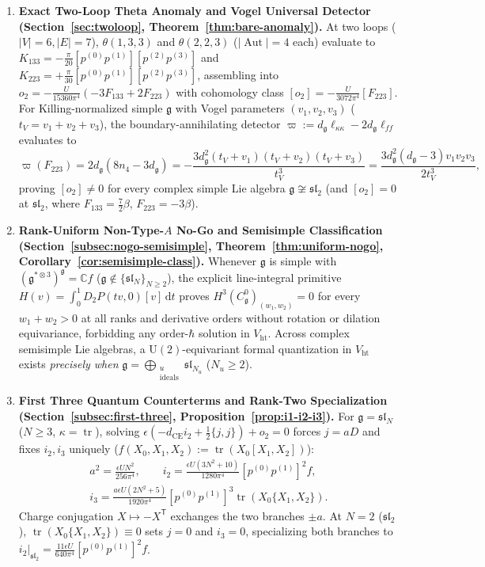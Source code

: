 \documentclass[11pt,letterpaper]{article}
\numberwithin{equation}{section}
\theoremstyle{plain}
\theoremstyle{definition}
\theoremstyle{remark}
\newcommand{\dd}{\mathrm{d}}
\newcommand{\fg}{\mathfrak{g}}
\newcommand{\fsl}{\mathfrak{sl}}
\newcommand{\tr}{\operatorname{tr}}
\newcommand{\Aut}{\operatorname{Aut}}
\newcommand{\Vht}{V_{\mathrm{ht}}}
\newcommand{\Cg}{C^0_{\fg}}
\begin{document}
\begin{enumerate}[label=\textbf{Result~\arabic*.},leftmargin=*]
  \item \textbf{Exact Two-Loop Theta Anomaly and Vogel Universal Detector (Section~\ref{sec:twoloop}, Theorem~\ref{thm:bare-anomaly}).} At two loops ($|V|=6, |E|=7$), $\theta(1,3,3)$ and $\theta(2,2,3)$ ($|\Aut|=4$ each) evaluate to $K_{133} = -\frac{\pi}{20}[p^{(0)}p^{(1)}][p^{(2)}p^{(3)}]$ and $K_{223} = +\frac{\pi}{30}[p^{(0)}p^{(1)}][p^{(2)}p^{(3)}]$, assembling into $o_2 = -\frac{U}{15360\pi^4}(-3F_{133}+2F_{223})$ with cohomology class $[o_2] = -\frac{U}{3072\pi^4}[F_{223}]$. For Killing-normalized simple $\fg$ with Vogel parameters $(v_1,v_2,v_3)$ ($t_V = v_1+v_2+v_3$), the boundary-annihilating detector $\varpi := d_{\fg}\ell_{\kappa\kappa} - 2d_{\fg}\ell_{ff}$ evaluates to
  \[
  \varpi(F_{223}) = 2d_{\fg}(8n_4 - 3d_{\fg}) = -\frac{3d_{\fg}^2(t_V+v_1)(t_V+v_2)(t_V+v_3)}{t_V^3} = \frac{3d_{\fg}^2(d_{\fg}-3)v_1 v_2 v_3}{2t_V^3},
  \]
  proving $[o_2] \neq 0$ for every complex simple Lie algebra $\fg \not\cong \fsl_2$ (and $[o_2] = 0$ at $\fsl_2$, where $F_{133} = \frac{7}{2}\beta$, $F_{223} = -3\beta$).

  \item \textbf{Rank-Uniform Non-Type-$A$ No-Go and Semisimple Classification (Section~\ref{subsec:nogo-semisimple}, Theorem~\ref{thm:uniform-nogo}, Corollary~\ref{cor:semisimple-class}).} Whenever $\fg$ is simple with $(\fg^{*\otimes 3})^{\fg} = \mathbb{C}f$ ($\fg \notin \{\fsl_N\}_{N\ge 2}$), the explicit line-integral primitive $H(v) = \int_0^1 D_2 P(tv,0)[v]\,\dd t$ proves $H^3(\Cg)_{(w_1,w_2)} = 0$ for every $w_1 + w_2 > 0$ at all ranks and derivative orders without rotation or dilation equivariance, forbidding any order-$\hbar$ solution in $\Vht$. Across complex semisimple Lie algebras, a $\mathrm{U}(2)$-equivariant formal quantization in $\Vht$ exists \emph{precisely when} $\fg = \bigoplus_{\substack{u\\\mathrm{ideals}}}\fsl_{N_u}$ ($N_u \ge 2$).

  \item \textbf{First Three Quantum Counterterms and Rank-Two Specialization (Section~\ref{subsec:first-three}, Proposition~\ref{prop:i1-i2-i3}).} For $\fg = \fsl_N$ ($N \ge 3$, $\kappa = \tr$), solving $\epsilon(-d_{\mathrm{CE}}i_2 + \frac{1}{2}\{j,j\}) + o_2 = 0$ forces $j = a D$ and fixes $i_2, i_3$ uniquely ($f(X_0,X_1,X_2) := \tr(X_0[X_1,X_2])$):
  \begin{gather*}
  a^2 = \frac{\epsilon U N^2}{256\pi^4},\qquad
  i_2 = \frac{\epsilon U(3N^2+10)}{1280\pi^4}[p^{(0)}p^{(1)}]^2 f,\\
  i_3 = \frac{a\epsilon U(2N^2+5)}{1920\pi^4}[p^{(0)}p^{(1)}]^3\tr(X_0\{X_1,X_2\}).
  \end{gather*}
  Charge conjugation $X \mapsto -X^{\mathsf{T}}$ exchanges the two branches $\pm a$. At $N=2$ ($\fsl_2$), $\tr(X_0\{X_1,X_2\}) \equiv 0$ sets $j = 0$ and $i_3 = 0$, specializing both branches to $i_2|_{\fsl_2} = \frac{11\epsilon U}{640\pi^4}[p^{(0)}p^{(1)}]^2 f$.


\end{enumerate}
\end{document}
